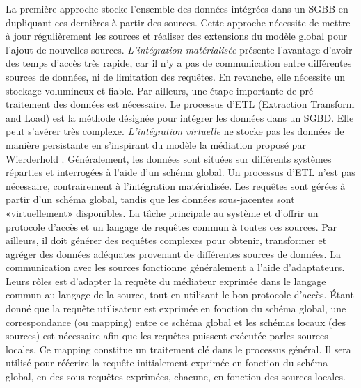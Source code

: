 La première approche stocke l'ensemble des données intégrées dans un SGBB en dupliquant ces dernières à partir des sources. Cette approche nécessite de mettre à jour régulièrement les sources et réaliser des extensions du modèle global pour l'ajout de nouvelles sources. \textit{L'intégration matérialisée} présente l'avantage d'avoir des temps d'accès très rapide, car il n'y a pas de communication entre différentes sources de données, ni de limitation des requêtes. En revanche, elle nécessite un stockage volumineux et fiable. Par ailleurs, une étape importante de pré-traitement des données est nécessaire. Le processus d'ETL (Extraction Transform and Load) est la méthode désignée pour intégrer les données dans un SGBD. Elle peut s'avérer très complexe. \textit{L'intégration virtuelle} ne stocke pas les données de manière persistante en s'inspirant du modèle la médiation proposé par Wierderhold  \cite{Wiederhold1995,wiederhold1997}. Généralement, les données sont situées sur différents systèmes réparties et interrogées à l'aide d'un schéma global. Un processus d'ETL n'est pas nécessaire, contrairement à l'intégration matérialisée. Les requêtes sont gérées à partir d'un schéma global, tandis que les données sous-jacentes sont «virtuellement» disponibles. La tâche principale au système et d'offrir un protocole d’accès et un langage de requêtes commun à toutes ces sources. Par ailleurs, il doit générer des requêtes complexes pour obtenir, transformer et agréger des données adéquates provenant de différentes sources de données. La communication avec les sources fonctionne généralement a l'aide d'adaptateurs. Leurs rôles est d'adapter la requête du médiateur exprimée dans le langage commun au langage de la source, tout en utilisant le bon protocole d’accès. Étant donné que la requête utilisateur est exprimée en fonction du schéma global, une correspondance (ou mapping) entre ce schéma global et les schémas locaux (des sources) est nécessaire  afin que les requêtes puissent exécutée parles sources locales.  Ce mapping constitue un traitement clé dans le processus général. Il sera utilisé pour réécrire la requête initialement exprimée en fonction du schéma global, en des sous-requêtes exprimées, chacune, en fonction des sources locales.\\

